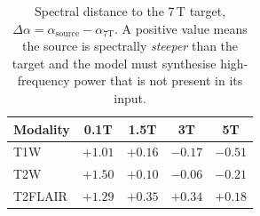 \begin{table}[t]
  \centering
  \small
  \caption{Spectral distance to the 7\,T target, $\Delta\alpha = \alpha_{\text{source}} - \alpha_{7\text{T}}$. A positive value means the source is spectrally \emph{steeper} than the target and the model must synthesise high-frequency power that is not present in its input.}
  \label{tab:delta-alpha-retro}
  \begin{tabular}{lcccc}
    \toprule
    Modality & 0.1T & 1.5T & 3T & 5T \\
    \midrule
    T1W & $+1.01$ & $+0.16$ & $-0.17$ & $-0.51$ \\
    T2W & $+1.50$ & $+0.10$ & $-0.06$ & $-0.21$ \\
    T2FLAIR & $+1.29$ & $+0.35$ & $+0.34$ & $+0.18$ \\
    \bottomrule
  \end{tabular}
\end{table}
